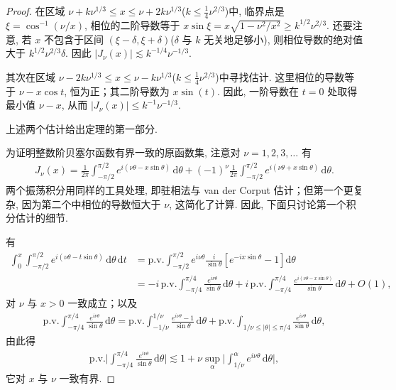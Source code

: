 \begin{proof}
在区域 $\nu + k\nu^{1/3} \leq x \leq \nu + 2k\nu^{1/3}$($k \leq \frac{1}{4}\nu^{2/3}$)中, 临界点是 $\xi = \cos^{-1}(\nu/x)$, 相位的二阶导数等于 $x\sin\xi = x\sqrt{1 - \nu^2/x^2} \geq k^{1/2}\nu^{2/3}$. 还要注意, 若 $x$ 不包含于区间 $(\xi - \delta, \xi + \delta)$($\delta$ 与 $k$ 无关地足够小), 则相位导数的绝对值大于 $k^{1/2}\nu^{2/3}\delta$. 因此 $|J_\nu(x)| \lesssim k^{-1/4}\nu^{-1/3}$.

其次在区域 $\nu - 2k\nu^{1/3} \leq x \leq \nu - k\nu^{1/3}$($k \leq \frac{1}{4}\nu^{2/3}$)中寻找估计. 这里相位的导数等于 $\nu - x\cos t$, 恒为正；其二阶导数为 $x\sin(t)$. 因此, 一阶导数在 $t = 0$ 处取得最小值 $\nu - x$, 从而 $|J_\nu(x)| \leq k^{-1}\nu^{-1/3}$.

上述两个估计给出定理的第一部分.

为证明整数阶贝塞尔函数有界一致的原函数集, 注意对 $\nu = 1, 2, 3, \ldots$ 有
\begin{align*}
  J_{\nu}(x)=\frac{1}{2\pi}\int_{-\pi/2}^{\pi/2}e^{i(\nu\theta-x\sin\theta)}\,\mathrm{d}\theta
  +(-1)^{\nu}\frac{1}{2\pi}\int_{-\pi/2}^{\pi/2}e^{i(\nu\theta+x\sin\theta)}\,\mathrm{d}\theta.
\end{align*}
两个振荡积分用同样的工具处理, 即驻相法与 van der Corput 估计；但第一个更复杂, 因为第二个中相位的导数恒大于 $\nu$, 这简化了计算. 因此, 下面只讨论第一个积分估计的细节.

有
\begin{align*}
  \int_{0}^{x}\int_{-\pi/2}^{\pi/2}e^{i(\nu\theta-t\sin\theta)}\,\mathrm{d}\theta\,\mathrm{d}t
  &=\mathrm{p.v.}\int_{-\pi/2}^{\pi/2}e^{i\nu\theta}\frac{i}{\sin\theta}\left[e^{-ix\sin\theta}-1\right]\mathrm{d}\theta\\
  &=-i\,\mathrm{p.v.}\int_{-\pi/4}^{\pi/4}\frac{e^{i\nu\theta}}{\sin\theta}\,\mathrm{d}\theta
   +i\,\mathrm{p.v.}\int_{-\pi/4}^{\pi/4}\frac{e^{i(\nu\theta-x\sin\theta)}}{\sin\theta}\,\mathrm{d}\theta
   +O(1),
\end{align*}
对 $\nu$ 与 $x > 0$ 一致成立；以及
\begin{align*}
  \mathrm{p.v.}\int_{-\pi/4}^{\pi/4}\frac{e^{i\nu\theta}}{\sin\theta}\,\mathrm{d}\theta
  =\mathrm{p.v.}\int_{-1/\nu}^{1/\nu}\frac{e^{i\nu\theta}-1}{\sin\theta}\,\mathrm{d}\theta
  +\mathrm{p.v.}\int_{1/\nu\leq|\theta|\leq\pi/4}\frac{e^{i\nu\theta}}{\sin\theta}\,\mathrm{d}\theta,
\end{align*}
由此得
\begin{align*}
  \mathrm{p.v.}\Big|\int_{-\pi/4}^{\pi/4}\frac{e^{i\nu\theta}}{\sin\theta}\,\mathrm{d}\theta\Big|
  \lesssim 1+\nu\sup_{\alpha}\Big|\int_{1/\nu}^{\alpha}e^{i\nu\theta}\,\mathrm{d}\theta\Big|,
\end{align*}
它对 $x$ 与 $\nu$ 一致有界.


\end{proof}
